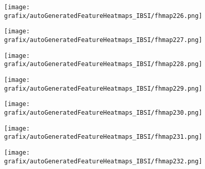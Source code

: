 \hspace{\hsp} 
\begin{subfigure}{\wid\textwidth} 
    \centering 
    \caption{\tiny \sffamily {}} 
    \vspace{\vsp} 
    \texttt{[image: grafix/autoGeneratedFeatureHeatmaps\_IBSI/fhmap226.png]} 
\end{subfigure} 
\hspace{\hsp} 
\begin{subfigure}{\wid\textwidth} 
    \centering 
    \caption{\tiny \sffamily {}} 
    \vspace{\vsp} 
    \texttt{[image: grafix/autoGeneratedFeatureHeatmaps\_IBSI/fhmap227.png]} 
\end{subfigure} 
\hspace{\hsp} 
\begin{subfigure}{\wid\textwidth} 
    \centering 
    \caption{\tiny \sffamily {}} 
    \vspace{\vsp} 
    \texttt{[image: grafix/autoGeneratedFeatureHeatmaps\_IBSI/fhmap228.png]} 
\end{subfigure} 
\hspace{\hsp} 
\begin{subfigure}{\wid\textwidth} 
    \centering 
    \caption{\tiny \sffamily {}} 
    \vspace{\vsp} 
    \texttt{[image: grafix/autoGeneratedFeatureHeatmaps\_IBSI/fhmap229.png]} 
\end{subfigure} 
\hspace{\hsp} 
\begin{subfigure}{\wid\textwidth} 
    \centering 
    \caption{\tiny \sffamily {}} 
    \vspace{\vsp} 
    \texttt{[image: grafix/autoGeneratedFeatureHeatmaps\_IBSI/fhmap230.png]} 
\end{subfigure} 
\hspace{\hsp} 
\begin{subfigure}{\wid\textwidth} 
    \centering 
    \caption{\tiny \sffamily {}} 
    \vspace{\vsp} 
    \texttt{[image: grafix/autoGeneratedFeatureHeatmaps\_IBSI/fhmap231.png]} 
\end{subfigure} 
\hspace{\hsp} 
\begin{subfigure}{\wid\textwidth} 
    \centering 
    \caption{\tiny \sffamily {}} 
    \vspace{\vsp} 
    \texttt{[image: grafix/autoGeneratedFeatureHeatmaps\_IBSI/fhmap232.png]} 
\end{subfigure} 
